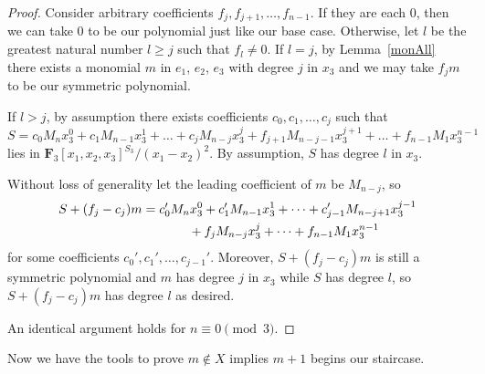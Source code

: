 \begin{proof}
 Consider arbitrary coefficients $f_{j}, f_{j+1},\ldots, f_{n-1}$. If they are each $0$, then we can take $0$ to be our polynomial just like our base case. Otherwise, let $l$ be the greatest natural number $l\geq j$ such that $f_l\neq 0$. If $l=j$, by Lemma~\ref{monAll} there exists a monomial $m$ in $e_1$, $e_2$, $e_3$ with degree $j$ in $x_3$ and we may take $f_jm$ to be our symmetric polynomial.

 If $l>j$, by assumption there exists coefficients $c_0,c_1,\dots,c_j$ such that
 \[S=c_0M_nx_3^0+c_1M_{n-1}x_3^1+\dots + c_{j}M_{n-j}x_3^{j}+f_{j+1}M_{n-j-1}x_3^{j+1}+\dots + f_{n-1}M_1x_3^{n-1}\]
 lies in $\mathbf{F}_3[x_1,x_2,x_3]^{S_3}/(x_1-x_2)^2$. By assumption, $S$ has degree $l$ in $x_3$.

 Without loss of generality let the leading coefficient of $m$ be $M_{n-j}$, so
 \begin{gather*}
 S+(f_j-c_j)m=c_0'M_nx_3^0+c_1'M_{n-1}x_3^1+\dots + c_{j-1}'M_{n-j+1}x_3^{j-1}\\
 \hphantom{S+(f_j-c_j)m=}{} +f_{j}M_{n-j}x_3^{j}+\dots + f_{n-1}M_1x_3^{n-1}\
 \end{gather*}
 for some coefficients $c_0',c_1',\ldots, c_{j-1}'$. Moreover, $S+(f_j-c_j)m$ is still a symmetric polynomial and $m$ has degree $j$ in $x_3$ while $S$ has degree $l$, so $S+(f_j-c_j)m$ has degree $l$ as desired.

 An identical argument holds for $n\equiv 0\pmod{3}$.
\end{proof}

Now we have the tools to prove $m\not\in X$ implies $m+1$ begins our staircase.

